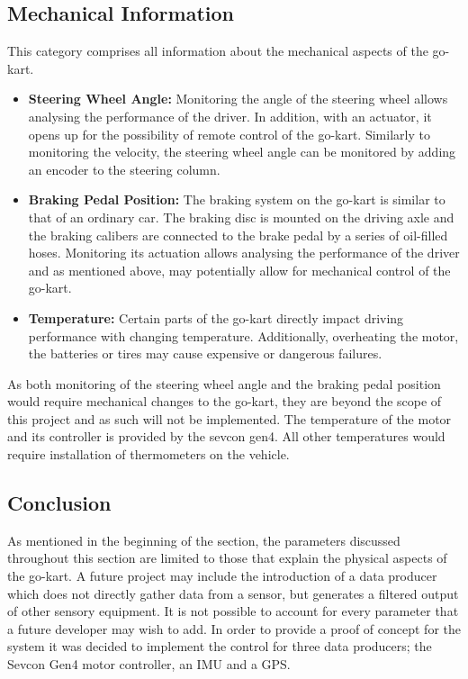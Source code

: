 \subsection{Mechanical Information}
This category comprises all information about the mechanical aspects of the go-kart.
\begin{itemize}
	\item \textbf{Steering Wheel Angle:} Monitoring the angle of the steering wheel allows analysing the performance of the driver.
	In addition, with an actuator, it opens up for the possibility of remote control of the go-kart.
	Similarly to monitoring the velocity, the steering wheel angle can be monitored by adding an encoder to the steering column.
	\item \textbf{Braking Pedal Position:} The braking system on the go-kart is similar to that of an ordinary car.
	The braking disc is mounted on the driving axle and the braking calibers are connected to the brake pedal by a series of oil-filled hoses.
	Monitoring its actuation allows analysing the performance of the driver and as mentioned above, may potentially allow for mechanical control of the go-kart.
	\item \textbf{Temperature:} Certain parts of the go-kart directly impact driving performance with changing temperature.
	Additionally, overheating the motor, the batteries or tires may cause expensive or dangerous failures.
\end{itemize}
As both monitoring of the steering wheel angle and the braking pedal position would require mechanical changes to the go-kart, they are beyond the scope of this project and as such will not be implemented.
The temperature of the motor and its controller is provided by the sevcon gen4.
All other temperatures would require installation of thermometers on the vehicle.

\subsection{Conclusion}
As mentioned in the beginning of the section, the parameters discussed throughout this section are limited to those that explain the physical aspects of the go-kart.
A future project may include the introduction of a data producer which does not directly gather data from a sensor, but generates a filtered output of other sensory equipment.
It is not possible to account for every parameter that a future developer may wish to add.
In order to provide a proof of concept for the system it was decided to implement the control for three data producers; the Sevcon Gen4 motor controller, an IMU and a GPS.

